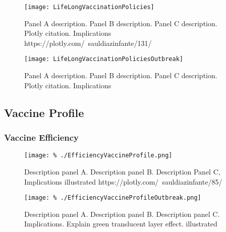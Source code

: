 \begin{figure*}[tbh!]
    \centering
    \texttt{[image: LifeLongVaccinationPolicies]}
    \caption[Lifelong induced immunity.]{%
        Panel A description. Panel B description.
        Panel C description. Plotly citation. Implications
        https://plotly.com/~sauldiazinfante/131/
}
    \label{fig:lifelongvaccinationpolicies}
\end{figure*}
\begin{figure*}[tbh!]
    \centering
    \texttt{[image: LifeLongVaccinationPoliciesOutbreak]}
    \caption[Lifelong induced immunity.]{Panel A description. Panel B description.
        Panel C description. Plotly citation. Implications}
    \label{fig:lifelongvaccinationpoliciesOutbreak}
\end{figure*}


\subsection{Vaccine Profile}
    \subsubsection*{Vaccine Efficiency}
        \begin{figure*}[htb]
            \centering
            \texttt{[image: \%
                ./EfficiencyVaccineProfile.png]}
            \caption[Optimal Vaccination
            Policy]{
                Description panel A.
                Description panel
                B. Description Panel C,
                Implications illustrated
                https://plotly.com/~sauldiazinfante/85/
        }
            \label{fig:efficiencyvaccineprofile}
        \end{figure*}


        \begin{figure*}[htb]
            \centering
            \texttt{[image: \%
            ./EfficiencyVaccineProfileOutbreak.png]}
            \caption[Optimal Vaccination
            Policy]{
                Description panel A.
                Description panel B.
                Description panel C.
                Implications.
                Explain green translucent layer effect.
                illustrated}
            \label{fig:efficiencyvaccineprofileOutbreak}
        \end{figure*}

